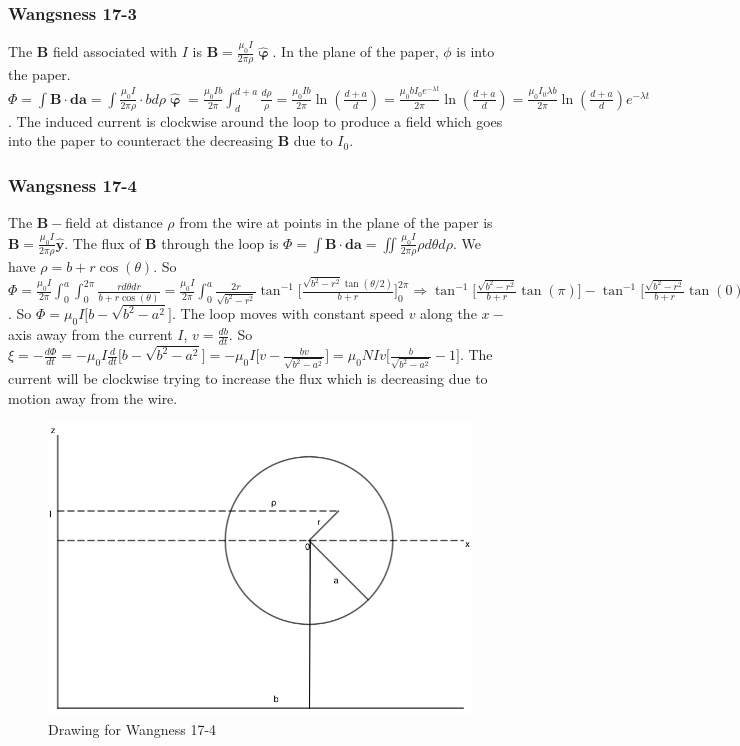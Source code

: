 \documentclass[crop=false,class=article,oneside]{standalone}
\begin{document}
        \subsubsection{Wangsness 17-3}
        The $\mathbf{B}$ field associated with $I$ is $\mathbf{B} = \frac{\mu_0 I}{2\pi \rho} \hat{\boldsymbol{\upvarphi}}$. In the plane of the paper, $\phi$ is into the paper. $\Phi = \int \mathbf{B}\cdot \mathbf{da} = \int \frac{\mu_0 I}{2\pi \rho} \cdot b d\rho \hat{\boldsymbol{\upvarphi}} = \frac{\mu_0Ib}{2\pi} \int_{d}^{d+a} \frac{d\rho}{\rho}= \frac{\mu_0 Ib}{2\pi} \ln(\frac{d+a}{d}) = \frac{\mu_0 bI_0 e^{-\lambda t}}{2\pi} \ln(\frac{d+a}{d}) = \frac{\mu_0 I_0 \lambda b}{2\pi} \ln(\frac{d+a}{d})e^{-\lambda t}$. The induced current is clockwise around the loop to produce a field which goes into the paper to counteract the decreasing $\mathbf{B}$ due to $I_0$.
        \subsubsection{Wangsness 17-4}
        The $\mathbf{B}-$field at distance $\rho$ from the wire at points in the plane of the paper is $\mathbf{B} = \frac{\mu_0 I}{2\pi \rho} \hat{\mathbf{y}}$. The flux of $\mathbf{B}$ through the loop is $\Phi = \int \mathbf{B}\cdot \mathbf{da} = \iint \frac{\mu_0 I}{2\pi \rho}\rho d\theta d\rho$. We have $\rho = b+r\cos(\theta)$. So $\Phi = \frac{\mu_0 I}{2\pi} \int_{0}^{a} \int_{0}^{2\pi} \frac{r d\theta dr}{b+r\cos(\theta)} = \frac{\mu_0 I}{2\pi} \int_{0}^{a} \frac{2r}{\sqrt{b^2-r^2}}\tan^{-1}\big[\frac{\sqrt{b^2-r^2}\tan(\theta/2)}{b+r}\big]_{0}^{2\pi} \Rightarrow \tan^{-1}\big[\frac{\sqrt{b^2-r^2}}{b+r}\tan(\pi)\big] - \tan^{-1}\big[ \frac{\sqrt{b^2-r^2}}{b+r}\tan(0)\big]$. So $\Phi = \mu_0 I\big[b-\sqrt{b^2-a^2}\big]$. The loop moves with constant speed $v$ along the $x-$axis away from the current $I$, $v = \frac{db}{dt}$. So $\xi = -\frac{d\Phi}{dt} = -\mu_0 I \frac{d}{dt}\big[b-\sqrt{b^2-a^2}\big] = -\mu_0 I\big[ v-\frac{bv}{\sqrt{b^2-a^2}}\big] = \mu_0 NIv\big[ \frac{b}{\sqrt{b^2-a^2}}-1\big]$. The current will be clockwise trying to increase the flux which is decreasing due to motion away from the wire.
        \begin{figure}[htbp]
            \centering
            \captionsetup{type=figure}
            \includegraphics[scale=0.4]{17-4.png}
            \caption[Drawing for Wangsness 17-4]{Drawing for Wangness 17-4}
        \end{figure}
\end{document}
